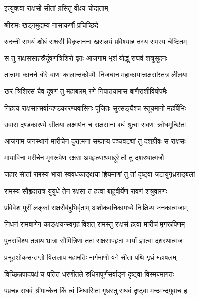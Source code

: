 

\onelineshloka
{इत्युक्त्वा राक्षसी सीतां ग्रसितुं वीक्ष्य चोद्यताम्}%

\onelineshloka
{श्रीरामः खड्गमुद्यम्य नासाकर्णौ प्रचिच्छिदे}%

\twolineshloka
{रुदन्ती सभयं शीघ्रं राक्षसी विकृतानना}
{खरालयं प्रविश्याह तस्य रामस्य चेष्टितम्}%

\twolineshloka
{स तु राक्षससाहस्रैर्दूषणत्रिशिरो वृतः}
{आजगाम भृशं योद्धुं राघवं शत्रुसूदनः}%

\twolineshloka
{तान्रामः कानने घोरे बाणः कालान्तकोपमैः}
{निजघान महाकायान्राक्षसांस्तत्र लीलया}%

\twolineshloka
{खरं त्रिशिरसं चैव दूषणं तु महाबलम्}
{रणे निपातयामास बाणैराशीविषोपमैः}%

\twolineshloka
{निहत्य राक्षसान्सर्वान्दण्डकारण्यवासिनः}
{पूजितः सुरसङ्घैश्च स्तूयमानो महर्षिभिः}%

\twolineshloka
{उवास दण्डकारण्ये सीतया लक्ष्मणेन च}
{राक्षसानां वधं श्रुत्वा रावणः क्रोधमूर्च्छितः}%

\twolineshloka
{आजगाम जनस्थानं मारीचेन दुरात्मना}
{सम्प्राप्य पञ्चवट्यां तु दशग्रीवः स राक्षसः}%

\twolineshloka
{मायाविना मरीचेन मृगरूपेण रक्षसः}
{अपहृत्याश्रमाद्दूरे तौ तु दशरथात्मजौ}%

\twolineshloka
{जहार सीतां रामस्य भार्यां स्ववधकाङ्क्षया}
{ह्रियमाणां तु तां दृष्ट्वा जटायुर्गृध्रराड्बली}%

\twolineshloka
{रामस्य सौहृदात्तत्र युयुधे तेन रक्षसा}
{तं हत्वा बाहुवीर्येण रावणं शत्रुवारणः}%

\twolineshloka
{प्रविवेश पुरीं लङ्कां राक्षसैर्बहुभिर्वृताम्}
{अशोकवनिकामध्ये निःक्षिप्य जनकात्मजाम्}%

\twolineshloka
{निधनं रामबाणेन काङ्क्षयन्स्वगृहं विशत्}
{रामस्तु राक्षसं हत्वा मारीचं मृगरूपिणम्}%

\twolineshloka
{पुनराविश्य तत्राथ भ्रात्रा सौमित्रिणा ततः}
{राक्षसापहृतां भार्यां ज्ञात्वा दशरथात्मजः}%

\twolineshloka
{प्रभूतशोकसन्तप्तो विललाप महामतिः}
{मार्गमाणो वने सीतां पथि गृध्रं महाबलम्}%

\twolineshloka
{विच्छिन्नपादपक्षं च पतितं धरणीतले}
{रुधिरापूर्णसर्वाङ्गं दृष्ट्वा विस्मयमागतः}%

\twolineshloka
{पप्रच्छ राघवं श्रीमान्केन किं त्वं जिघांसितः}
{गृध्रस्तु राघवं दृष्ट्वा मन्दमन्दमुवाच ह}%

